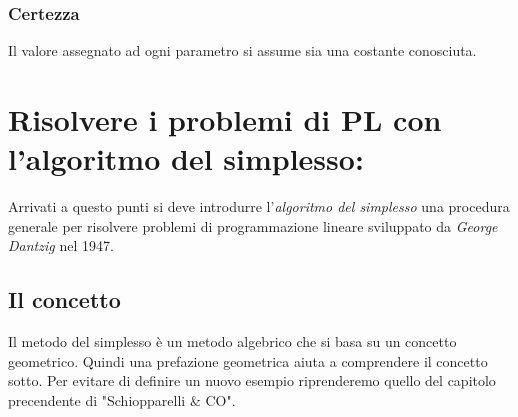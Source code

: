 \documentclass{article}
\begin{document}
\subsubsection{Certezza}
Il valore assegnato ad ogni parametro si assume sia una costante conosciuta.

\section{Risolvere i problemi di PL con l'algoritmo del simplesso:}
Arrivati a questo punti si deve introdurre l'\textit{algoritmo del simplesso} una procedura generale per risolvere problemi di programmazione lineare sviluppato da \textit{George Dantzig} nel 1947.

\subsection{Il concetto}
Il metodo del simplesso è un metodo algebrico che si basa su un concetto geometrico. Quindi una prefazione geometrica aiuta a comprendere il concetto sotto. Per evitare di definire un nuovo esempio riprenderemo quello del capitolo precendente di "Schiopparelli \& CO".
\end{document}
